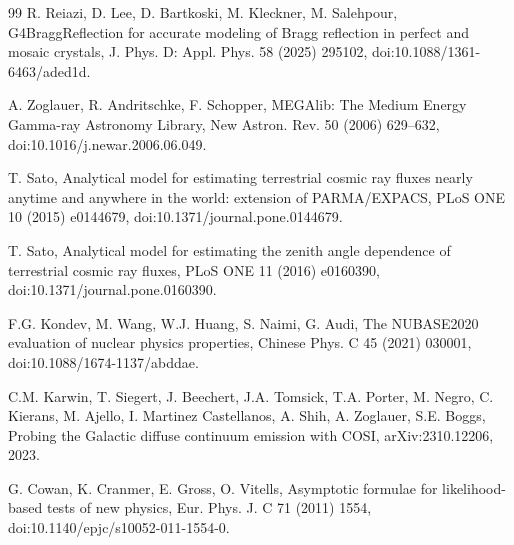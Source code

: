 \documentclass[11pt]{article}
\begin{document}
\begin{thebibliography}{99}
R. Reiazi, D. Lee, D. Bartkoski, M. Kleckner, M. Salehpour, G4BraggReflection for accurate modeling of Bragg reflection in perfect and mosaic crystals, J. Phys. D: Appl. Phys. 58 (2025) 295102, doi:10.1088/1361-6463/aded1d.

A. Zoglauer, R. Andritschke, F. Schopper, MEGAlib: The Medium Energy Gamma-ray Astronomy Library, New Astron. Rev. 50 (2006) 629--632, doi:10.1016/j.newar.2006.06.049.

T. Sato, Analytical model for estimating terrestrial cosmic ray fluxes nearly anytime and anywhere in the world: extension of PARMA/EXPACS, PLoS ONE 10 (2015) e0144679, doi:10.1371/journal.pone.0144679.

T. Sato, Analytical model for estimating the zenith angle dependence of terrestrial cosmic ray fluxes, PLoS ONE 11 (2016) e0160390, doi:10.1371/journal.pone.0160390.

F.G. Kondev, M. Wang, W.J. Huang, S. Naimi, G. Audi, The NUBASE2020 evaluation of nuclear physics properties, Chinese Phys. C 45 (2021) 030001, doi:10.1088/1674-1137/abddae.

C.M. Karwin, T. Siegert, J. Beechert, J.A. Tomsick, T.A. Porter, M. Negro, C. Kierans, M. Ajello, I. Martinez Castellanos, A. Shih, A. Zoglauer, S.E. Boggs, Probing the Galactic diffuse continuum emission with COSI, arXiv:2310.12206, 2023.

G. Cowan, K. Cranmer, E. Gross, O. Vitells, Asymptotic formulae for likelihood-based tests of new physics, Eur. Phys. J. C 71 (2011) 1554, doi:10.1140/epjc/s10052-011-1554-0.

\end{thebibliography}
\end{document}
